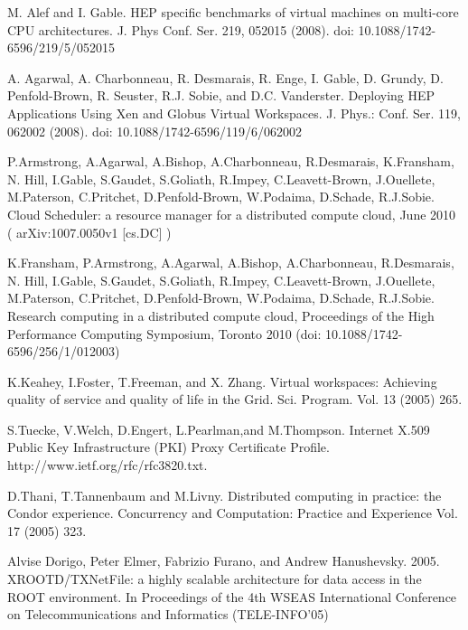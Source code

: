 \documentclass[10pt, conference, compsocconf]{IEEEtran}
\begin{document}
\begin{thebibliography}{1}

M. Alef and I. Gable.
HEP specific benchmarks of virtual machines on multi-core CPU architectures.
J. Phys Conf. Ser. 219, 052015 (2008).  
doi: 10.1088/1742-6596/219/5/052015

A. Agarwal, A. Charbonneau, R. Desmarais, R. Enge, I. Gable, D. Grundy, 
D. Penfold-Brown, R. Seuster, R.J. Sobie, and D.C. Vanderster.
Deploying HEP Applications Using Xen and Globus Virtual Workspaces. 
J. Phys.: Conf. Ser. 119, 062002 (2008).
 doi: 10.1088/1742-6596/119/6/062002

P.Armstrong, A.Agarwal, A.Bishop, A.Charbonneau, R.Desmarais, K.Fransham, N. Hill, 
I.Gable, S.Gaudet, S.Goliath, R.Impey, C.Leavett-Brown, J.Ouellete, M.Paterson, 
C.Pritchet, D.Penfold-Brown, W.Podaima, D.Schade, R.J.Sobie. 
Cloud Scheduler: a resource manager for a distributed compute cloud, 
June 2010 ( arXiv:1007.0050v1 [cs.DC] )

K.Fransham, P.Armstrong, A.Agarwal, A.Bishop, A.Charbonneau, R.Desmarais, N. Hill, 
I.Gable, S.Gaudet, S.Goliath, R.Impey, C.Leavett-Brown, J.Ouellete, M.Paterson, 
C.Pritchet, D.Penfold-Brown, W.Podaima, D.Schade, R.J.Sobie. 
Research computing in a distributed compute cloud, 
Proceedings of the High Performance Computing Symposium, Toronto 2010 
(doi: 10.1088/1742-6596/256/1/012003)

K.Keahey, I.Foster, T.Freeman, and X. Zhang.
Virtual workspaces: Achieving quality of service and quality of life in the Grid. 
Sci. Program. Vol. 13 (2005) 265.

S.Tuecke, V.Welch, D.Engert, L.Pearlman,and M.Thompson.
Internet X.509 Public Key Infrastructure (PKI) Proxy Certificate Profile.
http://www.ietf.org/rfc/rfc3820.txt.

D.Thani, T.Tannenbaum and M.Livny.
Distributed computing in practice: the Condor experience.
Concurrency and Computation: Practice and Experience
Vol. 17 (2005) 323.

Alvise Dorigo, Peter Elmer, Fabrizio Furano, and Andrew Hanushevsky. 2005. 
XROOTD/TXNetFile: a highly scalable architecture for data access in the ROOT environment. 
In Proceedings of the 4th WSEAS International Conference on Telecommunications 
and Informatics (TELE-INFO'05)

\end{thebibliography}
\end{document}

